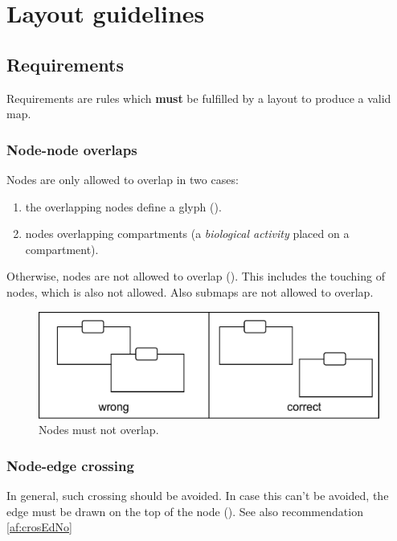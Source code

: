 \newpage

\section{Layout guidelines}

\subsection{Requirements}

Requirements are rules which \textbf{must} be fulfilled by a layout to produce a valid \SBGNAFLone map.

\subsubsection{Node-node overlaps}
\label{af:NoNoOv}

Nodes are only allowed to overlap in two cases:
\begin{enumerate}
  \item the overlapping nodes define a glyph (\eg {}).
  \item nodes overlapping compartments  (\eg a \emph{biological activity} placed on a compartment).
\end{enumerate}
Otherwise, nodes are not allowed to overlap (). This includes the touching of nodes, which is also not allowed. Also submaps are not allowed to overlap.

\begin{figure}[h!]
  \centering
  \includegraphics[scale=0.4]{images/layout-node-node}
  \caption{Nodes must not overlap.}\label{fig:af:layout1}
\end{figure}

\subsubsection{Node-edge crossing}
\label{af:crosEdNoRe}

In general, such crossing should be avoided.  In case this can't be avoided, the edge must be drawn on the top of the node (). See also recommendation \ref{af:crosEdNo} 

